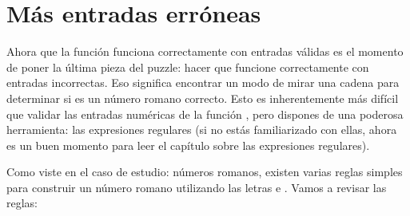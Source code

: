 \section{Más entradas erróneas}

Ahora que la función  funciona correctamente con entradas válidas es el momento de poner la última pieza del puzzle: hacer que funcione correctamente con entradas incorrectas. Eso significa encontrar un modo de mirar una cadena para determinar si es un número romano correcto. Esto es inherentemente más difícil que validar las entradas numéricas de la función , pero dispones de una poderosa herramienta: las expresiones regulares (si no estás familiarizado con ellas, ahora es un buen momento para leer el capítulo sobre las expresiones regulares).

Como viste en el caso de estudio: números romanos, existen varias reglas simples para construir un número romano utilizando las letras  e . Vamos a revisar las reglas:


